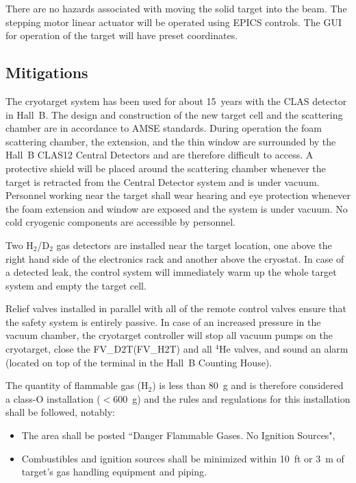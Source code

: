 There are no hazards associated with moving the solid target into the beam. The stepping 
motor linear actuator will be operated using EPICS controls. The GUI for operation of the 
target will have preset coordinates. 

\subsection{Mitigations}

The cryotarget system has been used for about 15~years with the CLAS detector in Hall~B. The 
design and construction of the new target cell and the scattering chamber are in accordance 
to AMSE standards. During operation the foam scattering chamber, the extension, and the thin 
window are surrounded by the Hall~B CLAS12 Central Detectors and are therefore difficult to 
access. A protective shield will be placed around the scattering chamber whenever the target 
is retracted from the Central Detector system and is under vacuum. Personnel working near the 
target shall wear hearing and eye protection whenever the foam extension and window are 
exposed and the system is under vacuum. No cold cryogenic components are accessible by personnel. 

Two H$_2$/D$_2$ gas detectors are installed near the target location, one above the right hand 
side of the electronics rack and another above the cryostat. In case of a detected leak, the 
control system will immediately warm up the whole target system and empty the target cell.

Relief valves installed in parallel with all of the remote control valves ensure that the 
safety system is entirely passive. In case of an increased pressure in the vacuum chamber, 
the cryotarget controller will stop all vacuum pumps on the cryotarget, close the 
FV\_D2T(FV\_H2T) and all $^4$He valves, and sound an alarm (located on top of the terminal 
in the Hall~B Counting House).

The quantity of flammable gas (H$_2$) is less than 80~g and is therefore considered a class-O 
installation ($<$600~g) and the rules and regulations for this installation shall be followed, 
notably:

\begin{itemize}

\item The area shall be posted ``Danger Flammable Gases.  No Ignition Sources",

\item Combustibles and ignition sources shall be minimized within 10~ft or 3~m of target's gas 
handling equipment and piping.
\end{itemize}

